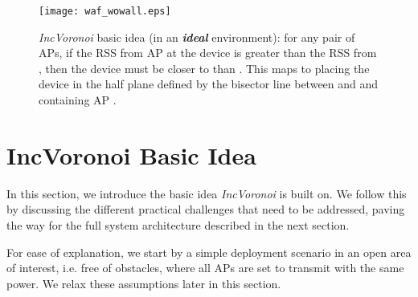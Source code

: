 \documentclass[conference]{IEEEtran}
\def \sys {\textit{IncVoronoi}}
\newcommand{\rulesep}{\vrule
}
\begin{document}
\begin{figure}[!t]
\centering
\texttt{[image: waf\_wowall.eps]}
\caption{\sys{} basic idea (in an \textbf{\emph{ideal}} environment): for any pair of APs, if the RSS from AP  at the device is greater than the RSS from , then the device must be closer to  than . This maps to placing the device in the half plane defined by the bisector line between  and  and containing AP .}
\label{fig:half_plan}
\end{figure}

\begin{figure*}[!t]
    \hspace{0.08mm}\rulesep
    \hspace{0.08mm}\rulesep
    \hspace{0.08mm}\rulesep
    \hspace{0.08mm}
    \caption{Example of the \sys{} basic approach with four APs. Note that the order of applying the constraints does not matter and that some constraints are redundant given other constraints (e.g. constraint () does not reduce the user ambiguity region after applying the other constraints).}
    \label{fig:example}
  \end{figure*}
	\section{IncVoronoi Basic Idea}
\label{sec:basic}
In this section, we introduce the basic idea \sys{} is built on. We follow this by discussing the different practical challenges that need to be addressed, paving the way for the full system architecture described in the next section.

For ease of explanation, we start by a simple deployment scenario in an open area of interest, i.e. free of obstacles, where all APs 
 are set to transmit with the same power. We relax these assumptions later in this section.
\end{document}
